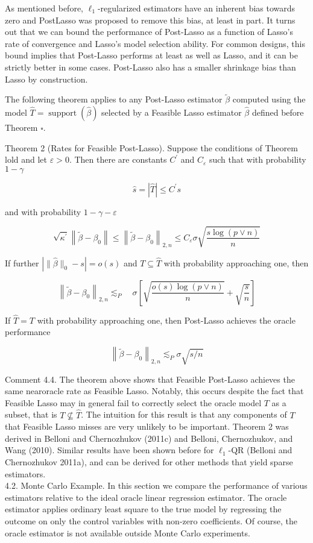 \documentclass[10pt]{article}
\begin{document}
As mentioned before, \(\ell_{1}\)-regularized estimators have an inherent bias towards zero and PostLasso was proposed to remove this bias, at least in part. It turns out that we can bound the performance of Post-Lasso as a function of Lasso's rate of convergence and Lasso's model selection ability. For common designs, this bound implies that Post-Lasso performs at least as well as Lasso, and it can be strictly better in some cases. Post-Lasso also has a smaller shrinkage bias than Lasso by construction.

The following theorem applies to any Post-Lasso estimator \(\widetilde{\beta}\) computed using the model \(\widehat{T}=\operatorname{support}(\widehat{\beta})\) selected by a Feasible Lasso estimator \(\widehat{\beta}\) defined before Theorem \(\boldsymbol{\square}\).

Theorem 2 (Rates for Feasible Post-Lasso). Suppose the conditions of Theorem lold and let \(\varepsilon>0\). Then there are constants \(C^{\prime}\) and \(C_{\varepsilon}\) such that with probability \(1-\gamma\)

\[
\widehat{s}=|\widehat{T}| \leqslant C^{\prime} s
\]

and with probability \(1-\gamma-\varepsilon\)

\[
\sqrt{\kappa^{\prime}}\left\|\widetilde{\beta}-\beta_{0}\right\| \leqslant\left\|\widetilde{\beta}-\beta_{0}\right\|_{2, n} \leqslant C_{\varepsilon} \sigma \sqrt{\frac{s \log (p \vee n)}{n}}
\]

If further \(\left|\|\widehat{\beta}\|_{0}-s\right|=o(s)\) and \(T \subseteq \widehat{T}\) with probability approaching one, then

\[
\left\|\widetilde{\beta}-\beta_{0}\right\|_{2, n} \lesssim_{P} \quad \sigma\left[\sqrt{\frac{o(s) \log (p \vee n)}{n}}+\sqrt{\frac{s}{n}}\right]
\]

If \(\widehat{T}=T\) with probability approaching one, then Post-Lasso achieves the oracle performance

\[
\left\|\widetilde{\beta}-\beta_{0}\right\|_{2, n} \lesssim_{P} \sigma \sqrt{s / n}
\]

Comment 4.4. The theorem above shows that Feasible Post-Lasso achieves the same nearoracle rate as Feasible Lasso. Notably, this occurs despite the fact that Feasible Lasso may in general fail to correctly select the oracle model \(T\) as a subset, that is \(T \nsubseteq \widehat{T}\). The intuition for this result is that any components of \(T\) that Feasible Lasso misses are very unlikely to be important. Theorem 2 was derived in Belloni and Chernozhukov (2011c) and Belloni, Chernozhukov, and Wang (2010). Similar results have been shown before for \(\ell_{1}\)-QR (Belloni and Chernozhukov 2011a), and can be derived for other methods that yield sparse estimators.\\
4.2. Monte Carlo Example. In this section we compare the performance of various estimators relative to the ideal oracle linear regression estimator. The oracle estimator applies ordinary least square to the true model by regressing the outcome on only the control variables with non-zero coefficients. Of course, the oracle estimator is not available outside Monte Carlo experiments.
\end{document}
